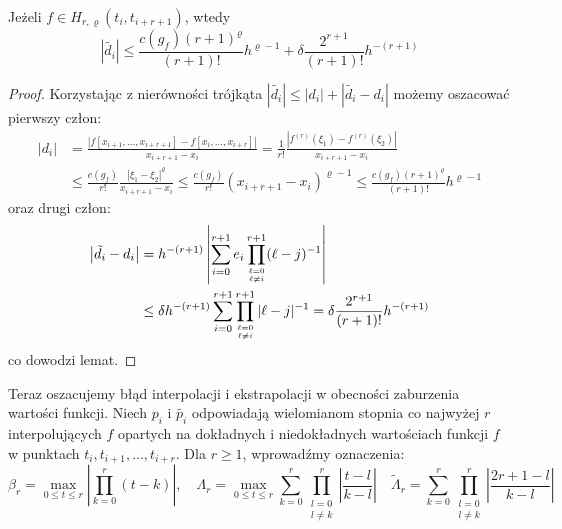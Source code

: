 \documentclass[oik, pdftex, robocza, man]{mgrwms}
\begin{document}
    \begin{lemma} \label{lem:algMP_1}
        Jeżeli $f \in H_{r, \varrho}(t_{i}, t_{i+r+1})$, wtedy
        \begin{equation*}
            |\tilde{d_{i}}| \leq \frac{c(g_{f})(r+1)^{\varrho}}{(r+1)!} h^{\varrho-1} + \delta \frac{2^{r+1}}{(r+1)!} h^{-(r+1)}
        \end{equation*}
    \end{lemma}
    \begin{proof}
        Korzystając z nierówności trójkąta $|\tilde{d_{i}}|  \leq |d_{i}| + |\tilde{d_{i}} - d_{i}|$ możemy oszacować pierwszy człon:
        \begin{equation}
            \begin{aligned}
            \left|d_{i}\right| &=\frac{\left|f\left[x_{i+1}, \ldots, x_{i+r+1}\right]-f\left[x_{i}, \ldots, x_{i+r}\right]\right|}{x_{i+r+1}-x_{i}} 
                = \frac{1}{r !} \frac{\left|f^{(r)}\left(\xi_{1}\right)-f^{(r)}\left(\xi_{2}\right)\right|}{x_{i+r+1}-x_{i}} \\
            & \leq \frac{c\left(g_{f}\right)}{r !} \frac{\left|\xi_{1}-\xi_{2}\right|^{\varrho}}{x_{i+r+1}-x_{i}} 
                \leq \frac{c\left(g_{f}\right)}{r !}\left(x_{i+r+1}-x_{i}\right)^{\varrho-1} 
                \leq \frac{c\left(g_{f}\right)(r+1)^{\varrho}}{(r+1) !} h^{\varrho-1}
            \end{aligned}
        \end{equation}
        oraz drugi człon:
        \begin{equation}
            \begin{aligned}
            \left|\tilde{d}_{i}-d_{i}\right| & =h^{-(r+1)}\left|\sum_{i=0}^{r+1} e_{i} \prod_{\ell=0 \atop \ell \neq i}^{r+1}(\ell-j)^{-1}\right| \\
            & \leq \delta h^{-(r+1)} \sum_{i=0}^{r+1} \prod_{\ell=0 \atop \ell \neq i}^{r+1}|\ell-j|^{-1}=\delta \frac{2^{r+1}}{(r+1) !} h^{-(r+1)}
            \end{aligned}
        \end{equation}
        co dowodzi lemat.
    \end{proof}

    Teraz oszacujemy błąd interpolacji i ekstrapolacji w obecności zaburzenia wartości funkcji. Niech $p_{i}$ i $\tilde{p_{i}}$ odpowiadają wielomianom stopnia co najwyżej $r$ interpolujących $f$ opartych na dokładnych i niedokładnych wartościach funkcji $f$ w punktach $t_{i}, t_{i+1}, \dots, t_{i+r}$. Dla $r \geq 1$, wprowadźmy oznaczenia: 
    \begin{equation*}
        \beta_{r} = \max_{0 \leq t \leq r} \left|\prod_{k=0}^{r} (t-k)\right|, \quad
        \Lambda_{r} = \max_{0 \leq t \leq r} \sum_{k=0}^{r} \prod_{\substack{l=0 \\ l \neq k}}^{r} \left| \frac{t-l}{k-l} \right| \quad
        \tilde{\Lambda}_{r} = \sum_{k=0}^{r} \prod_{\substack{l=0 \\ l \neq k}}^{r} \left| \frac{2r+1-l}{k-l} \right|
    \end{equation*}
\end{document}
